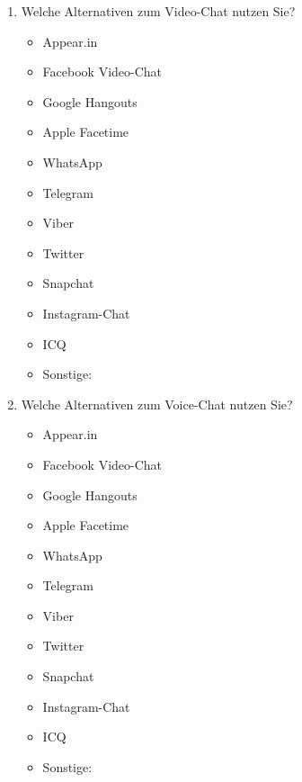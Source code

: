 
\begin{enumerate}[resume]
\item  Welche Alternativen zum Video-Chat nutzen Sie?\label{App2:NutzenAlt}

		\begin{itemize}
		\item[\Circle] Appear.in
        \item[\Circle] Facebook Video-Chat
        \item[\Circle] Google Hangouts
        \item[\Circle] Apple Facetime
        \item[\Circle] WhatsApp
        \item[\Circle] Telegram
        \item[\Circle] Viber
        \item[\Circle] Twitter
        \item[\Circle] Snapchat
        \item[\Circle] Instagram-Chat
        \item[\Circle] ICQ
        \item[\Circle] Sonstige:~\underline{\hspace{7.5cm}}
        \end{itemize}


\item Welche Alternativen zum Voice-Chat nutzen Sie?

		\begin{itemize}
		\item[\Circle] Appear.in
        \item[\Circle] Facebook Video-Chat
        \item[\Circle] Google Hangouts
        \item[\Circle] Apple Facetime
        \item[\Circle] WhatsApp
        \item[\Circle] Telegram
        \item[\Circle] Viber
        \item[\Circle] Twitter
        \item[\Circle] Snapchat
        \item[\Circle] Instagram-Chat
        \item[\Circle] ICQ
        \item[\Circle] Sonstige:~\underline{\hspace{7.5cm}}
        \end{itemize}


\end{enumerate}
